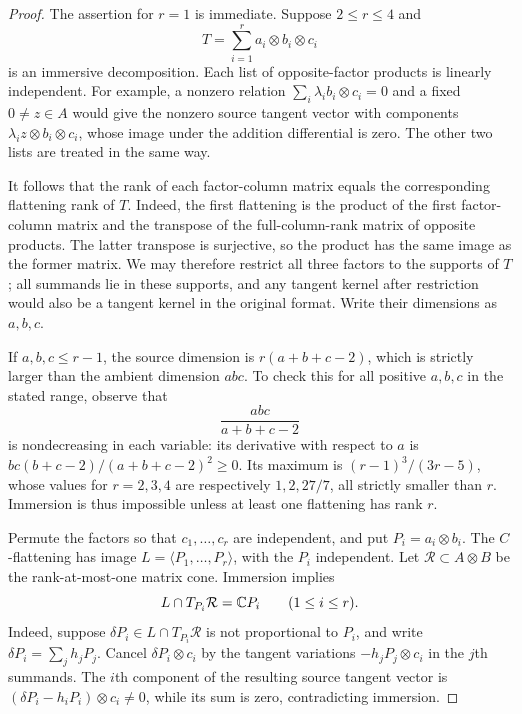 \begin{proof}
The assertion for $r=1$ is immediate. Suppose $2\leq r\leq4$ and
\[
 T=\sum_{i=1}^r a_i\otimes b_i\otimes c_i
\]
is an immersive decomposition. Each list of opposite-factor products
is linearly independent. For example, a nonzero relation
$\sum_i\lambda_i b_i\otimes c_i=0$ and a fixed $0\neq z\in A$
would give the nonzero source tangent vector with components
$\lambda_i z\otimes b_i\otimes c_i$, whose image under the addition
differential is zero. The other two lists are treated in the same way.

It follows that the rank of each factor-column matrix equals the
corresponding flattening rank of $T$. Indeed, the first flattening is
the product of the first factor-column matrix and the transpose of
the full-column-rank matrix of opposite products. The latter transpose
is surjective, so the product has the same image as the former matrix.
We may therefore restrict all three factors to the supports of $T$;
all summands lie in these supports, and any tangent kernel after
restriction would also be a tangent kernel in the original format.
Write their dimensions as $a,b,c$.

If $a,b,c\leq r-1$, the source dimension is $r(a+b+c-2)$, which is
strictly larger than the ambient dimension $abc$. To check this for
all positive $a,b,c$ in the stated range, observe that
\[
 \frac{abc}{a+b+c-2}
\]
is nondecreasing in each variable: its derivative with respect to $a$
is $bc(b+c-2)/(a+b+c-2)^2\geq0$. Its maximum is
$(r-1)^3/(3r-5)$, whose values for $r=2,3,4$ are respectively
$1,2,27/7$, all strictly smaller than $r$. Immersion is thus impossible
unless at least one flattening has rank $r$.

Permute the factors so that $c_1,\ldots,c_r$ are independent, and put
$P_i=a_i\otimes b_i$. The $C$-flattening has image
$L=\langle P_1,\ldots,P_r\rangle$, with the $P_i$ independent.
Let $\mathcal R\subset A\otimes B$ be the rank-at-most-one matrix cone.
Immersion implies
\begin{equation}\label{bound:scalar-tangent}
 L\cap T_{P_i}\mathcal R=\mathbb C P_i\qquad(1\leq i\leq r).
\end{equation}
Indeed, suppose $\delta P_i\in L\cap T_{P_i}\mathcal R$ is not
proportional to $P_i$, and write $\delta P_i=\sum_j h_jP_j$.
Cancel $\delta P_i\otimes c_i$ by the tangent variations
$-h_jP_j\otimes c_i$ in the $j$th summands. The $i$th component of
the resulting source tangent vector is
$(\delta P_i-h_iP_i)\otimes c_i\neq0$, while its sum is zero,
contradicting immersion.


\end{proof}
